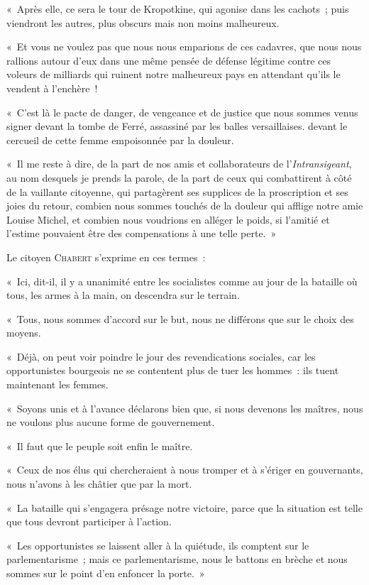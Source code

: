 \documentclass[french,twoside]{book} %
\newenvironment{quoteblock}%
  {\begin{quoting}}
  {\end{quoting}}
\newenvironment{quotebar}{%
    \def\FrameCommand{{\color{rubric!10!}\vrule width 0.5em} \hspace{0.9em}}%
    \def\OuterFrameSep{\itemsep} %
    \MakeFramed {\advance\hsize-\width \FrameRestore}
  }%
  {%
    \endMakeFramed
  }
\renewenvironment{quoteblock}%
  {%
    \savenotes
    \setstretch{0.9}
    \normalfont
    \begin{quotebar}
  }
  {%
    \end{quotebar}
    \spewnotes
  }
\begin{document}
\begin{quoteblock}
 « Après elle, ce sera le tour de Kropotkine, qui agonise dans les cachots ; puis viendront les autres, plus obscurs mais non moins malheureux.\par
 « Et vous ne voulez pas que nous nous emparions de ces cadavres, que nous nous rallions autour d’eux dans une même pensée de défense légitime contre ces voleurs de milliards qui ruinent notre malheureux pays en attendant qu’ils le vendent à l’enchère !\par
 « C’est là le pacte de danger, de vengeance et de justice que nous sommes venus signer devant la tombe de Ferré, assassiné par les balles versaillaises. devant le cercueil de cette femme empoisonnée par la douleur.\par
 « Il me reste à dire, de la part de nos amis et collaborateurs de l’\emph{Intransigeant}, au nom desquels je prends la parole, de la part de ceux qui combattirent à côté de la vaillante citoyenne, qui partagèrent ses supplices de la proscription et ses joies du retour, combien nous sommes touchés de la douleur qui afflige notre amie Louise Michel, et combien nous voudrions en alléger le poids, si l’amitié et l’estime pouvaient être des compensations à une telle perte. »\par
 \bigbreak
 \noindent Le citoyen C{\scshape habert} s’exprime en ces termes :\par
 \bigbreak
 \noindent « Ici, dit-il, il y a unanimité entre les socialistes comme au jour de la bataille où tous, les armes à la main, on descendra sur le terrain.\par
 « Tous, nous sommes d’accord sur le but, nous ne différons que sur le choix des moyens.\par
 « Déjà, on peut voir poindre le jour des revendications sociales, car les opportunistes bourgeois ne se contentent plus de tuer les hommes : ils tuent maintenant les femmes.\par
 « Soyons unis et à l’avance déclarons bien que, si nous devenons les maîtres, nous ne voulons plus aucune forme de gouvernement.\par
 « Il faut que le peuple soit enfin le maître.\par
 « Ceux de nos élus qui chercheraient à nous tromper et à s’ériger en gouvernants, nous n’avons à les châtier que par la mort.\par
   « La bataille qui s’engagera présage notre victoire, parce que la situation est telle que tous devront participer à l’action.\par
 « Les opportunistes se laissent aller à la quiétude, ils comptent sur le parlementarisme ; mais ce parlementarisme, nous le battons en brèche et nous sommes sur le point d’en enfoncer la porte. »\par

\end{quoteblock}
\end{document}
